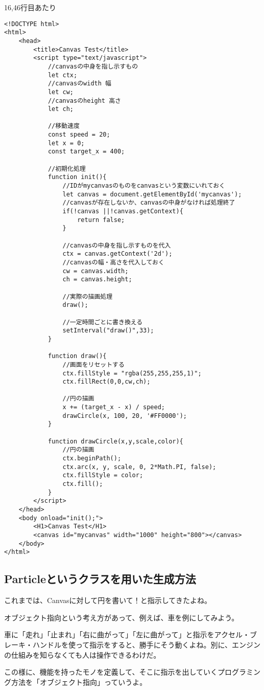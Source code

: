\documentclass[mingoth,11pt,a4j,uplatex]{jsarticle}
\begin{document}
16,46行目あたり
\begin{lstlisting}[caption=摩擦のシミュレーション]
<!DOCTYPE html>
<html>
	<head>
		<title>Canvas Test</title>
		<script type="text/javascript">
			//canvasの中身を指し示すもの
			let ctx;
			//canvasのwidth 幅
			let cw;
			//canvasのheight 高さ
			let ch;
			
			//移動速度
			const speed = 20;
			let x = 0;
			const target_x = 400;
			
			//初期化処理
			function init(){
				//IDがmycanvasのものをcanvasという変数にいれておく
				let canvas = document.getElementById('mycanvas');
				//canvasが存在しないか、canvasの中身がなければ処理終了
				if(!canvas ||!canvas.getContext){
					return false;
				}
				
				//canvasの中身を指し示すものを代入
				ctx = canvas.getContext('2d');
				//canvasの幅・高さを代入しておく
				cw = canvas.width;
				ch = canvas.height;
				
				//実際の描画処理
				draw();
				
				//一定時間ごとに書き換える
				setInterval("draw()",33);
			}
			
			function draw(){
				//画面をリセットする
				ctx.fillStyle = "rgba(255,255,255,1)";
				ctx.fillRect(0,0,cw,ch);
				
				//円の描画
				x += (target_x - x) / speed;
				drawCircle(x, 100, 20, '#FF0000');
			}
			
			function drawCircle(x,y,scale,color){
				//円の描画
				ctx.beginPath();
				ctx.arc(x, y, scale, 0, 2*Math.PI, false);
				ctx.fillStyle = color;
				ctx.fill();
			}
		</script>
	</head>
	<body onload="init();">
		<H1>Canvas Test</H1>
		<canvas id="mycanvas" width="1000" height="800"></canvas>
	</body>
</html>
\end{lstlisting}

\subsection{Particleというクラスを用いた生成方法}
これまでは、Canvasに対して円を書いて！と指示してきたよね。

オブジェクト指向という考え方があって、例えば、車を例にしてみよう。

車に「走れ」「止まれ」「右に曲がって」「左に曲がって」と指示をアクセル・ブレーキ・ハンドルを使って指示をすると、勝手にそう動くよね。別に、エンジンの仕組みを知らなくても人は操作できるわけだ。

この様に、機能を持ったモノを定義して、そこに指示を出していくプログラミング方法を「オブジェクト指向」っていうよ。
\end{document}
